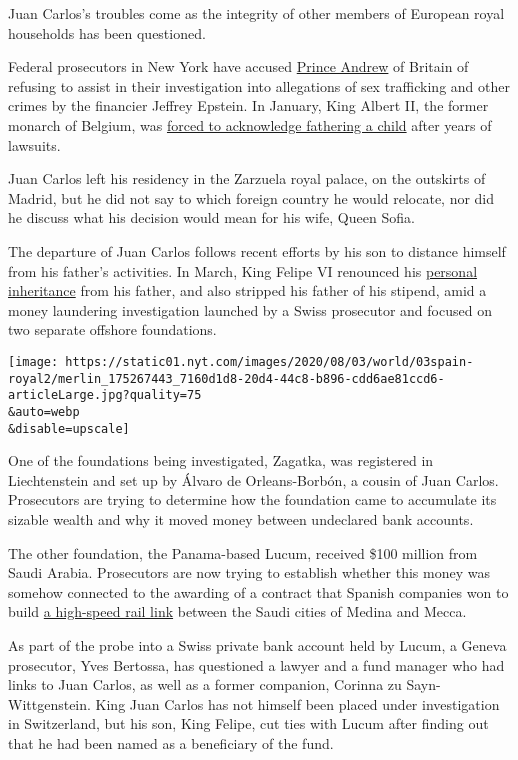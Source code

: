 Juan Carlos's troubles come as the integrity of other members of
European royal households has been questioned.

Federal prosecutors in New York have accused
\href{https://www.nytimes.com/2020/06/08/nyregion/jeffrey-epstein-prince-andrew.html}{Prince
Andrew} of Britain of refusing to assist in their investigation into
allegations of sex trafficking and other crimes by the financier Jeffrey
Epstein. In January, King Albert II, the former monarch of Belgium, was
\href{https://www.nytimes.com/2020/01/28/world/europe/belgium-king-albert-delphine-boel.html}{forced
to acknowledge fathering a child} after years of lawsuits.

Juan Carlos left his residency in the Zarzuela royal palace, on the
outskirts of Madrid, but he did not say to which foreign country he
would relocate, nor did he discuss what his decision would mean for his
wife, Queen Sofia.

The departure of Juan Carlos follows recent efforts by his son to
distance himself from his father's activities. In March, King Felipe VI
renounced his
\href{https://www.nytimes.com/2020/03/15/world/europe/king-felipe-juan-carlos-spain.html}{personal
inheritance} from his father, and also stripped his father of his
stipend, amid a money laundering investigation launched by a Swiss
prosecutor and focused on two separate offshore foundations.

\texttt{[image: https://static01.nyt.com/images/2020/08/03/world/03spain-royal2/merlin\_175267443\_7160d1d8-20d4-44c8-b896-cdd6ae81ccd6-articleLarge.jpg?quality=75\\\&auto=webp\\\&disable=upscale]}

One of the foundations being investigated, Zagatka, was registered in
Liechtenstein and set up by Álvaro de Orleans-Borbón, a cousin of Juan
Carlos. Prosecutors are trying to determine how the foundation came to
accumulate its sizable wealth and why it moved money between undeclared
bank accounts.

The other foundation, the Panama-based Lucum, received \$100 million
from Saudi Arabia. Prosecutors are now trying to establish whether this
money was somehow connected to the awarding of a contract that Spanish
companies won to build
\href{https://www.nytimes.com/2019/03/14/reader-center/saudi-arabia-high-speed-train-medina-mecca.html}{a
high-speed rail link} between the Saudi cities of Medina and Mecca.

As part of the probe into a Swiss private bank account held by Lucum, a
Geneva prosecutor, Yves Bertossa, has questioned a lawyer and a fund
manager who had links to Juan Carlos, as well as a former companion,
Corinna zu Sayn-Wittgenstein. King Juan Carlos has not himself been
placed under investigation in Switzerland, but his son, King Felipe, cut
ties with Lucum after finding out that he had been named as a
beneficiary of the fund.

